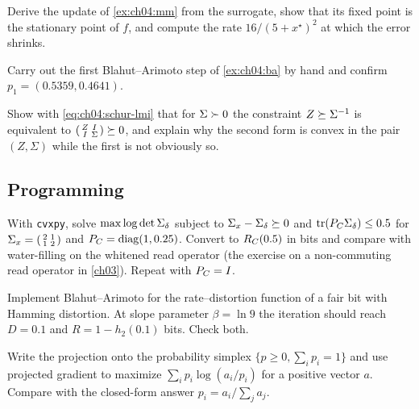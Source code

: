 \begin{exercise}\label{exr:ch04:mmfix}
Derive the update of \cref{ex:ch04:mm} from the surrogate, show that its fixed point is the stationary point of $f$, and compute the rate $16/(5+x^\star)^2$ at which the error shrinks.
\end{exercise}

\begin{exercise}\label{exr:ch04:bastep}
Carry out the first Blahut--Arimoto step of \cref{ex:ch04:ba} by hand and confirm $p_1=(0.5359,0.4641)$.
\end{exercise}

\begin{exercise}\label{exr:ch04:schur}
Show with \eqref{eq:ch04:schur-lmi} that for $\Sigma\succ0$ the constraint $Z\succeq\Sigma^{-1}$ is equivalent to $\begin{psmallmatrix}Z&I\\I&\Sigma\end{psmallmatrix}\succeq0$, and explain why the second form is convex in the pair $(Z,\Sigma)$ while the first is not obviously so.
\end{exercise}

\subsection*{Programming}

\begin{exercise}\label{exr:ch04:cvx}
With \texttt{cvxpy}, solve $\max\log\det\Sigma_\delta$ subject to $\Sigma_x-\Sigma_\delta\succeq0$ and $\operatorname{tr}(P_C\Sigma_\delta)\le0.5$ for $\Sigma_x=\begin{psmallmatrix}2&1\\1&2\end{psmallmatrix}$ and $P_C=\operatorname{diag}(1,0.25)$. Convert to $R_C(0.5)$ in bits and compare with water-filling on the whitened read operator (the exercise on a non-commuting read operator in \cref{ch03}). Repeat with $P_C=I$.
\end{exercise}

\begin{exercise}\label{exr:ch04:bard}
Implement Blahut--Arimoto for the rate--distortion function of a fair bit with Hamming distortion. At slope parameter $\beta=\ln9$ the iteration should reach $D=0.1$ and $R=1-h_2(0.1)$ bits. Check both.
\end{exercise}

\begin{exercise}\label{exr:ch04:simplex}
Write the projection onto the probability simplex $\{p\ge0,\sum_ip_i=1\}$ and use projected gradient to maximize $\sum_ip_i\log(a_i/p_i)$ for a positive vector $a$. Compare with the closed-form answer $p_i=a_i/\sum_ja_j$.
\end{exercise}


